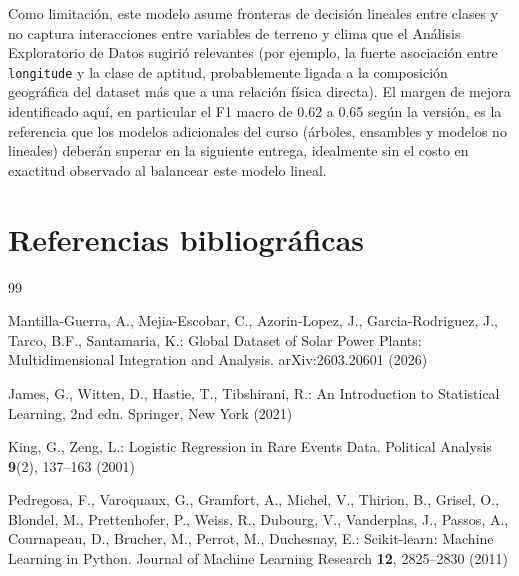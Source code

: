 \documentclass[pdflatex,sn-mathphys-num]{sn-jnl}
\begin{document}
Como limitación, este modelo asume fronteras de decisión lineales entre clases y no captura interacciones entre variables de terreno y clima que el Análisis Exploratorio de Datos sugirió relevantes (por ejemplo, la fuerte asociación entre \texttt{longitude} y la clase de aptitud, probablemente ligada a la composición geográfica del dataset más que a una relación física directa). El margen de mejora identificado aquí, en particular el F1 macro de 0.62 a 0.65 según la versión, es la referencia que los modelos adicionales del curso (árboles, ensambles y modelos no lineales) deberán superar en la siguiente entrega, idealmente sin el costo en exactitud observado al balancear este modelo lineal.

\section*{Referencias bibliográficas}

\begin{thebibliography}{99}

 Mantilla-Guerra, A., Mejia-Escobar, C., Azorin-Lopez, J., Garcia-Rodriguez, J., Tarco, B.F., Santamaria, K.: Global Dataset of Solar Power Plants: Multidimensional Integration and Analysis. arXiv:2603.20601 (2026)

 James, G., Witten, D., Hastie, T., Tibshirani, R.: An Introduction to Statistical Learning, 2nd edn. Springer, New York (2021)

 King, G., Zeng, L.: Logistic Regression in Rare Events Data. Political Analysis \textbf{9}(2), 137--163 (2001)

 Pedregosa, F., Varoquaux, G., Gramfort, A., Michel, V., Thirion, B., Grisel, O., Blondel, M., Prettenhofer, P., Weiss, R., Dubourg, V., Vanderplas, J., Passos, A., Cournapeau, D., Brucher, M., Perrot, M., Duchesnay, E.: Scikit-learn: Machine Learning in Python. Journal of Machine Learning Research \textbf{12}, 2825--2830 (2011)

\end{thebibliography}
\end{document}
